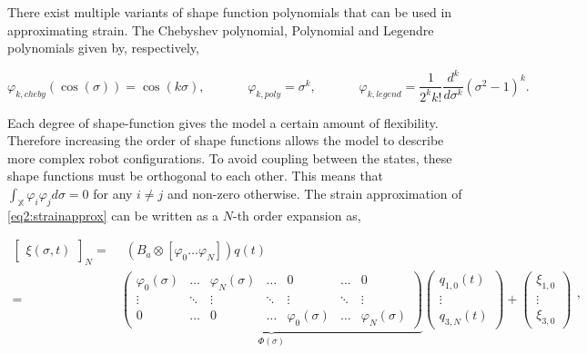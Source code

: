 There exist multiple variants of shape function polynomials that can be used in approximating strain. The Chebyshev polynomial, Polynomial and Legendre polynomials given by, respectively,

\begin{equation}
    \varphi_{k,cheby}(\cos(\sigma)) = \cos(k \sigma), \hspace{40pt} \varphi_{k,poly} = \sigma^k, \hspace{40pt} \varphi_{k,legend} = \frac{1}{2^k k!} \frac{d^k}{d\sigma^k}(\sigma^2-1)^k.
    \label{eq2:shapefunction}
\end{equation}


Each degree of shape-function gives the model a certain amount of flexibility. Therefore increasing the order of shape functions allows the model to describe more complex robot configurations. To avoid coupling between the states, these shape functions must be orthogonal to each other. This means that $\int_\mathbb{X} \varphi_i \varphi_j d \sigma = 0$ for any $i \neq j$ and non-zero otherwise. The strain approximation of \ref{eq2:strainapprox} can be written as a $N$-th order expansion as,



\begin{equation}
\begin{aligned}
    \begin{bmatrix}\xi(\sigma,t)\end{bmatrix}_N = & \hspace{5pt}  (B_a \otimes [ \varphi_0 \dots \varphi_N ])q(t)\\ = &  \underbrace{ \begin{pmatrix}
    \varphi_0(\sigma) & \dots  & \varphi_N(\sigma) & \dots     & 0      & \dots  &  0 \\
    \vdots    & \ddots & \vdots    & \ddots    & \vdots & \ddots & \vdots \\
    0         & \dots  & 0         & \dots     & \varphi_0(\sigma) & \dots & \varphi_N (\sigma)
    \end{pmatrix}}_{\Phi(\sigma)} \begin{pmatrix} q_{1,0}(t) \\ \vdots \\ q_{3,N}(t) \end{pmatrix} +  \begin{pmatrix} \xi_{1,0} \\ \vdots \\ \xi_{3,0}   \end{pmatrix}
    \end{aligned},
\label{eq2:xishape}
\end{equation}

